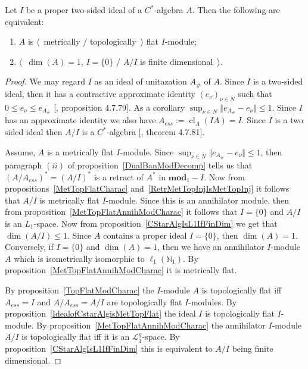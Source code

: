 \begin{proposition}\label{CStarAlgIsTopFlatOverItsIdeal} Let $I$ be a proper
two-sided ideal of a  $C^*$-algebra $A$. Then the following are equivalent:

\begin{enumerate}[label = (\roman*)]
    \item $A$ is $\langle$~metrically / topologically~$\rangle$ flat $I$-module;

    \item $\langle$~$\operatorname{dim}(A)=1$, $I= \{0 \}$ / $A/I$ is finite
    dimensional~$\rangle$.
\end{enumerate}
\end{proposition}
\begin{proof} We may regard $I$ as an  ideal of unitazation $A_\#$ of $A$. Since
$I$ is a two-sided ideal, then it has a contractive approximate identity
${(e_\nu)}_{\nu\in N}$ such that $0\leq e_\nu\leq e_{A_\#}$
[\cite{HelBanLocConvAlg}, proposition 4.7.79]. As a 
corollary $\sup_{\nu\in N}\Vert e_{A_\#}-e_\nu\Vert\leq 1$. Since $I$ has an 
approximate identity we also have $A_{ess}:=\operatorname{cl}_A(IA)=I$. 
Since $I$ is a two sided ideal then $A/I$ is a $C^*$-algebra 
[\cite{HelBanLocConvAlg}, theorem 4.7.81].

Assume, $A$ is a metrically flat $I$-module. Since 
$\sup_{\nu\in N}\Vert e_{A_\#}-e_\nu\Vert\leq 1$, then paragraph $(ii)$ of
proposition~\ref{DualBanModDecomp} tells us that ${(A/A_{ess})}^*={(A/I)}^*$ is 
a retract of $A^*$ in $\mathbf{mod}_1-I$. Now from
propositions~\ref{MetTopFlatCharac} and~\ref{RetrMetTopInjIsMetTopInj} it
follows that $A/I$ is metrically flat $I$-module. Since this is an annihilator
module, then from proposition~\ref{MetTopFlatAnnihModCharac} it follows that 
$I= \{0 \}$ and $A/I$ is an $L_1$-space. Now from
proposition~\ref{CStarAlgIsL1IfFinDim} we get that 
$\operatorname{dim}(A/I)\leq 1$. Since $A$ contains a proper 
ideal $I= \{0 \}$, then $\operatorname{dim}(A)=1$. Conversely, 
if $I= \{0 \}$ and $\operatorname{dim}(A)=1$, then we have an 
annihilator $I$-module $A$ which is isometrically isomorphic 
to $\ell_1(\mathbb{N}_1)$. By proposition~\ref{MetTopFlatAnnihModCharac} 
it is metrically flat. 

By proposition~\ref{TopFlatModCharac} the $I$-module $A$ is topologically flat
iff $A_{ess}=I$ and $A/A_{ess}=A/I$ are topologically flat $I$-modules. By
proposition~\ref{IdealofCstarAlgisMetTopFlat} the ideal $I$ is topologically
flat $I$-module. By proposition~\ref{MetTopFlatAnnihModCharac} the annihilator
$I$-module $A/I$ is topologically flat iff it is an $\mathscr{L}_1^g$-space. By
proposition~\ref{CStarAlgIsL1IfFinDim} this is equivalent to $A/I$ being finite
dimensional.
\end{proof}

